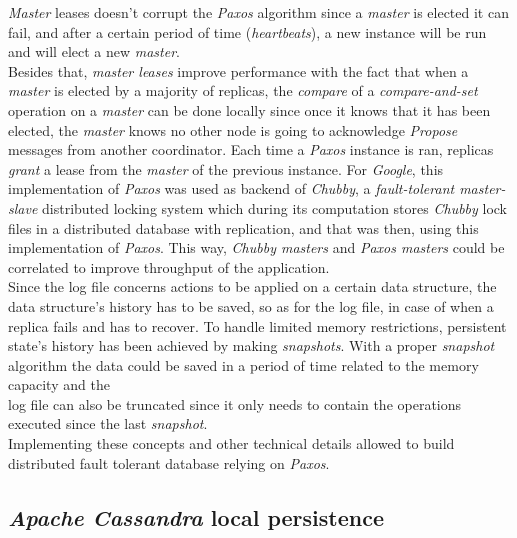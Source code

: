 \documentclass[a4paper]{report}
\newcommand{\ca}{\emph{Apache Cassandra\xspace}}
\newcommand{\px}{\emph{Paxos\xspace}}
\begin{document}
\emph{Master} leases doesn't corrupt the \px{} algorithm since a \emph{master} is elected it can fail, and after a certain period of time (\emph{heartbeats}), a new instance will be run and will elect a new \emph{master}.\\
Besides that, \emph{master leases} improve performance with the fact that when a \emph{master} is elected by a majority of replicas, the \emph{compare} of a \emph{compare-and-set} operation on a \emph{master} can be done locally since once it knows that it has been elected, the \emph{master} knows no other node is going to acknowledge \emph{Propose} messages from another coordinator. Each time a \px{} instance is ran, replicas \emph{grant} a lease from the \emph{master} of the previous instance. For \emph{Google}, this implementation of \px{} was used as backend of \emph{Chubby}, a \emph{fault-tolerant master-slave} distributed locking system which during its computation stores \emph{Chubby} lock files in a distributed database with replication, and that was then, using this implementation of \px{}. This way, \emph{Chubby masters} and \emph{Paxos masters} could be correlated to improve throughput of the application.\\
Since the log file concerns actions to be applied on a certain data structure, the data structure's history has to be saved, so as for the log file, in case of when a replica fails and has to recover. To handle limited memory restrictions, persistent state's history has been achieved by making \emph{snapshots}. With a proper \emph{snapshot} algorithm the data could be saved in a period of time related to the memory capacity and the \\
log file can also be truncated since it only needs to contain the operations executed since the last \emph{snapshot}.\\
Implementing these concepts and other technical details allowed to build distributed fault tolerant database relying on \px{}.

\subsection{\ca{} local persistence} %
\label{sub:ca_local_persitency}
\end{document}
